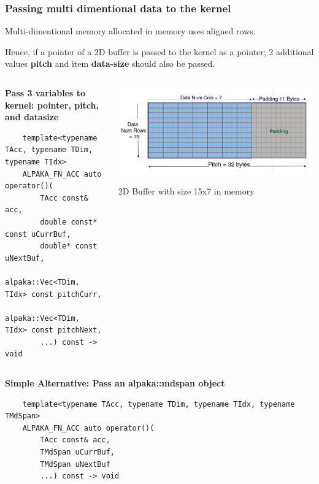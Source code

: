 \documentclass[9pt]{beamer}
\begin{document}
\begin{frame}[fragile]
\scriptsize
\frametitle{Passing multi dimentional data to the kernel}
Multi-dimentional memory allocated in memory uses aligned rows.

Hence, if a pointer of a 2D buffer is passed to the kernel as a pointer; 2 additional values \textbf{pitch} and item \textbf{data-size} should also be passed.


\begin{columns} %
    \begin{column}{0.55\textwidth} %
    
        \textbullet \hspace{0.5em} \textbf{Pass 3 variables to kernel: pointer, pitch, and datasize}
            
        \lstset{basicstyle=\ttfamily\tiny} 
        \begin{lstlisting}
    template<typename TAcc, typename TDim, typename TIdx>
    ALPAKA_FN_ACC auto operator()(
        TAcc const& acc,
        double const* const uCurrBuf,
        double* const uNextBuf,
        alpaka::Vec<TDim, TIdx> const pitchCurr,
        alpaka::Vec<TDim, TIdx> const pitchNext,
        ...) const -> void
        \end{lstlisting}
    \end{column}

    \begin{column}{0.48\textwidth} %
        \hspace{-0.2\baselineskip}
        \centering
 
     \includegraphics[width=1\linewidth]{Screenshot from 2024-09-04 17-16-43.png}
     \caption{2D Buffer with size 15x7 in memory}
     \label{fig:enter-label}
 
    \end{column}
\end{columns}
\textbullet \hspace{0.5em} \textbf{Simple Alternative: Pass an alpaka::mdspan object}
\lstset{basicstyle=\ttfamily\tiny} 
\begin{lstlisting}
    template<typename TAcc, typename TDim, typename TIdx, typename TMdSpan>
    ALPAKA_FN_ACC auto operator()(
        TAcc const& acc,
        TMdSpan uCurrBuf,
        TMdSpan uNextBuf
        ...) const -> void
\end{lstlisting}

\end{frame}
\end{document}
